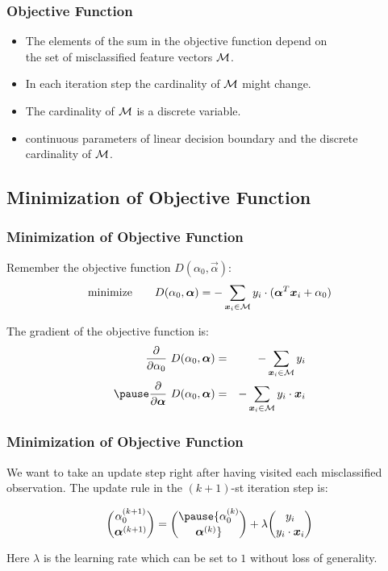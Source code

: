 \begin{frame}
  \frametitle{Objective Function \cont}

  \begin{itemize}
    \item The elements of the sum in the objective function depend on \\
      the set of misclassified feature vectors $\cal M$. \\[.5cm] \pause
    \item In each iteration step the cardinality of $\cal M$ might change. \\[.5cm] \pause
    \item The cardinality of $\cal M$ is a discrete variable. \\[.5cm] \pause
    \item {} continuous parameters of linear decision boundary and the discrete cardinality of $\cal M$.
  \end{itemize}
\end{frame}


\subsection{Minimization of Objective Function}

\begin{frame}
  \frametitle{Minimization of Objective Function}

  Remember the objective function $D(\alpha_0, \vec \alpha)$:
  \begin{displaymath}
    \mbox{minimize} \quad \quad D(\alpha_0, \vec \alpha)= -\sum_{\vec x_i\in {\cal M}} y_i \cdot (\vec \alpha^T\vec x_i + \alpha_0)
  \end{displaymath}
  \pause
 
  The gradient of the objective function is: \pause
  \begin{eqnarray*}
    \frac{\partial}{\partial \alpha_0} \ D(\alpha_0, \vec \alpha)&=&  -\sum_{\vec x_i\in {\cal M}} y_i \\ \pause
    \frac{\partial}{\partial \vec\alpha} \ D(\alpha_0, \vec \alpha)&=& -\sum_{\vec x_i\in {\cal M}} y_i\cdot  \vec x_i \\
  \end{eqnarray*}
\end{frame}


\begin{frame}
  \frametitle{Minimization of Objective Function \cont}

  We want to take an update step right after having visited each misclassified observation.
  The update rule in the $(k+1)$-st iteration step is:

  \begin{displaymath}
    { \alpha_0^{(k+1)} \choose \vec \alpha^{(k+1)}} = \pause  { \alpha_0^{(k)} \choose \vec \alpha^{(k)}} + \lambda {y_i \choose y_i\cdot \vec x_i}
  \end{displaymath} 

  Here $\lambda$ is the learning rate which can be set to $1$ without loss of generality.
\end{frame}


